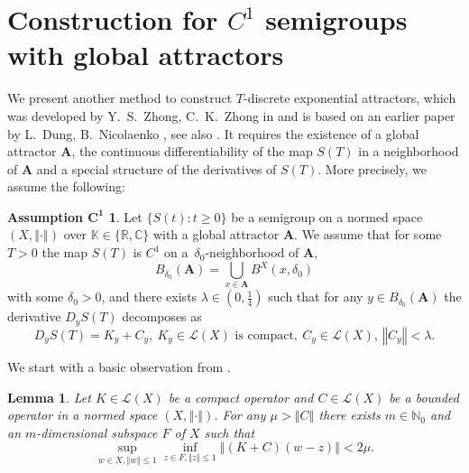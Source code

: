 \documentclass[a4paper,12pt,reqno]{amsart}
\theoremstyle{plain}
\newtheorem{lem}{Lemma}[section]
\theoremstyle{definition}
\newtheorem*{assc1}{Assumption $\mathbf{C^1}$}
\numberwithin{equation}{section}
\newcommand{\N}{\mathbb{N}}
\newcommand{\R}{\mathbb{R}}
\newcommand{\C}{\mathbb{C}}
\newcommand{\K}{\mathbb{K}}
\newcommand{\norm}[1]{\left\Vert#1\right\Vert}
\renewcommand{\geq}{\geqslant}
\renewcommand{\leq}{\leqslant}
\begin{document}
\section{Construction for $C^1$ semigroups with global attractors}\label{sec:C1}

We present another method to construct $T$-discrete exponential attractors, which was developed by Y.~S.~Zhong, C.~K.~Zhong in \cite{ZZ12} and is based on an earlier paper by L.~Dung, B.~Nicolaenko \cite{DN01}, see also \cite{CLR10, CCLR22}. It requires the existence of a global attractor $\mathbf{A}$, the continuous differentiability of the map $S(T)$ in a neighborhood of $\mathbf{A}$ and a special structure of the derivatives of $S(T)$. More precisely, we assume the following:  

\begin{assc1}
Let $\{S(t)\colon t\geq 0\}$ be a semigroup on a normed space $(X,\norm{\cdot})$ over $\K\in\{\R,\C\}$ with a global attractor $\mathbf{A}$. 
We assume that for some $T>0$ the map $S(T)$ is $C^1$ on a~$\delta_0$-neighborhood of $\mathbf{A}$, 
$$B_{\delta_0}(\mathbf{A})=\bigcup_{x\in\mathbf{A}}B^{X}(x,\delta_0)$$
with some $\delta_0>0$, and there exists $\lambda\in(0,\frac{1}{4})$ such that for any $y\in B_{\delta_0}(\mathbf{A})$  the derivative $D_yS(T)$ decomposes as 
\begin{equation}\label{e:SMALLLAM}
D_{y}S(T)=K_{y}+C_{y},\ K_{y}\in\mathcal{L}(X)\text{ is compact},\ C_{y}\in\mathcal{L}(X),\ \norm{C_y}<\lambda.
\end{equation}
\end{assc1}

We start with a basic observation from \cite[Lemma 2.4]{CLR10}.

\begin{lem}\label{lem:APPROXFINITE}
Let $K\in\mathcal{L}(X)$ be a compact operator and $C\in\mathcal{L}(X)$ be a bounded operator in a normed space $(X,\norm{\cdot})$.
For any $\mu>\norm{C}$ there exists $m\in\N_0$ and an $m$-dimensional subspace $F$ of $X$ such that
\begin{equation*}
\sup_{w\in X, \norm{w}\leq 1}\inf_{z\in F, \norm{z}\leq 1}\norm{(K+C)(w-z)}<2\mu. 
\end{equation*}
\end{lem} 
\end{document}

